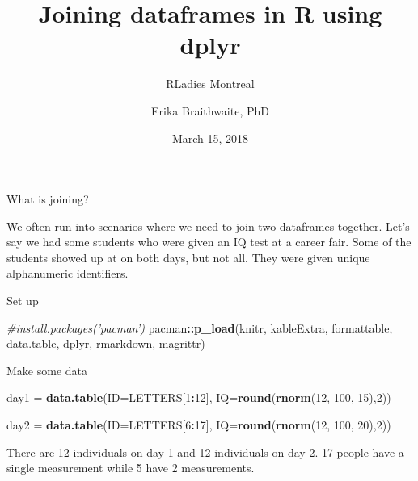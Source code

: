 \documentclass[ignorenonframetext,]{beamer}
\title{Joining dataframes in R using dplyr}
\subtitle{RLadies Montreal}
\author{Erika Braithwaite, PhD}
\date{March 15, 2018}
\newenvironment{Shaded}{\begin{snugshade}}{\end{snugshade}}
\newcommand{\KeywordTok}[1]{\textcolor[rgb]{0.13,0.29,0.53}{\textbf{#1}}}
\newcommand{\DataTypeTok}[1]{\textcolor[rgb]{0.13,0.29,0.53}{#1}}
\newcommand{\DecValTok}[1]{\textcolor[rgb]{0.00,0.00,0.81}{#1}}
\newcommand{\StringTok}[1]{\textcolor[rgb]{0.31,0.60,0.02}{#1}}
\newcommand{\CommentTok}[1]{\textcolor[rgb]{0.56,0.35,0.01}{\textit{#1}}}
\newcommand{\OperatorTok}[1]{\textcolor[rgb]{0.81,0.36,0.00}{\textbf{#1}}}
\newcommand{\NormalTok}[1]{#1}
\begin{document}
\frame{\titlepage}

\begin{frame}[fragile]{What is joining?}

We often run into scenarios where we need to join two dataframes
together. Let's say we had some students who were given an IQ test at a
career fair. Some of the students showed up at on both days, but not
all. They were given unique alphanumeric identifiers.

Set up

\begin{Shaded}
\begin{Highlighting}[]
\CommentTok{#install.packages('pacman')}
\NormalTok{pacman}\OperatorTok{::}\KeywordTok{p_load}\NormalTok{(knitr, kableExtra, formattable, data.table, dplyr, }
\NormalTok{               rmarkdown, magrittr)}
\end{Highlighting}
\end{Shaded}

Make some data

\begin{Shaded}
\begin{Highlighting}[]
\NormalTok{day1 =}\StringTok{  }\KeywordTok{data.table}\NormalTok{(}\DataTypeTok{ID=}\NormalTok{LETTERS[}\DecValTok{1}\OperatorTok{:}\DecValTok{12}\NormalTok{],}
                 \DataTypeTok{IQ=}\KeywordTok{round}\NormalTok{(}\KeywordTok{rnorm}\NormalTok{(}\DecValTok{12}\NormalTok{, }\DecValTok{100}\NormalTok{, }\DecValTok{15}\NormalTok{),}\DecValTok{2}\NormalTok{))}

\NormalTok{day2 =}\StringTok{  }\KeywordTok{data.table}\NormalTok{(}\DataTypeTok{ID=}\NormalTok{LETTERS[}\DecValTok{6}\OperatorTok{:}\DecValTok{17}\NormalTok{],}
                 \DataTypeTok{IQ=}\KeywordTok{round}\NormalTok{(}\KeywordTok{rnorm}\NormalTok{(}\DecValTok{12}\NormalTok{, }\DecValTok{100}\NormalTok{, }\DecValTok{20}\NormalTok{),}\DecValTok{2}\NormalTok{))}
\end{Highlighting}
\end{Shaded}

There are 12 individuals on day 1 and 12 individuals on day 2. 17 people
have a single measurement while 5 have 2 measurements.

\end{frame}
\end{document}
